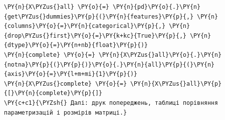 \begin{Verbatim}[commandchars=\\\{\}]
\PY{n}{X\PYZus{}all} \PY{o}{=} \PY{n}{pd}\PY{o}{.}\PY{n}{get\PYZus{}dummies}\PY{p}{(}\PY{n}{features}\PY{p}{,} \PY{n}{columns}\PY{o}{=}\PY{n}{categorical}\PY{p}{,} \PY{n}{drop\PYZus{}first}\PY{o}{=}\PY{k+kc}{True}\PY{p}{,} \PY{n}{dtype}\PY{o}{=}\PY{n+nb}{float}\PY{p}{)}
\PY{n}{complete} \PY{o}{=} \PY{n}{X\PYZus{}all}\PY{o}{.}\PY{n}{notna}\PY{p}{(}\PY{p}{)}\PY{o}{.}\PY{n}{all}\PY{p}{(}\PY{n}{axis}\PY{o}{=}\PY{l+m+mi}{1}\PY{p}{)}
\PY{n}{X\PYZus{}complete} \PY{o}{=} \PY{n}{X\PYZus{}all}\PY{p}{[}\PY{n}{complete}\PY{p}{]}
\PY{c+c1}{\PYZsh{} Далі: друк попереджень, таблиці порівняння параметризацій і розмірів матриці.}
\end{Verbatim}
